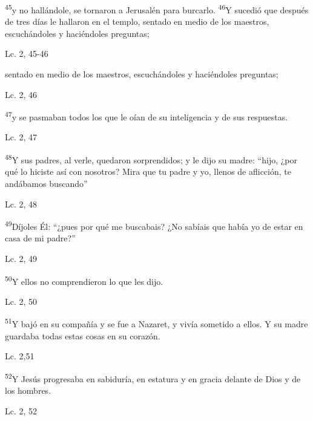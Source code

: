 \documentclass[a4paper,11pt]{article}
\begin{document}
      \textsuperscript{45}y no hallándole, se tornaron a Jerusalén para burcarlo. \textsuperscript{46}Y sucedió que después de tres días le hallaron en el templo,
      sentado en medio de los maestros, escuchándoles y haciéndoles preguntas;
      \begin{flushright}
        Lc. 2, 45-46       
      \end{flushright}
      
      sentado en medio de los maestros, escuchándoles y haciéndoles preguntas;
      \begin{flushright}
        Lc. 2, 46       
      \end{flushright}
      
      \textsuperscript{47}y se pasmaban todos los que le oían de su inteligencia y de sus respuestas.
      \begin{flushright}
        Lc. 2, 47     
      \end{flushright}

      \textsuperscript{48}Y sus padres, al verle, quedaron sorprendidos; y le dijo su madre: ``hijo, ¿por qué lo hiciste así con nosotros? Mira que tu padre
      y yo, llenos de aflicción, te andábamos buscando''
      \begin{flushright}
        Lc. 2, 48     
      \end{flushright}
      
      \textsuperscript{49}Díjoles Él: ``¿pues por qué me buscabais? ¿No sabíais que había yo de estar en casa de mi padre?''
      \begin{flushright}
        Lc. 2, 49        
      \end{flushright}
      
      \textsuperscript{50}Y ellos no comprendieron lo que les dijo.
      \begin{flushright}
        Lc. 2, 50        
      \end{flushright}
      
      \textsuperscript{51}Y bajó en su compañía y se fue a Nazaret, y vivía sometido a ellos. Y su madre guardaba todas estas
      cosas en su corazón.
      \begin{flushright}
        Lc. 2,51       
      \end{flushright}      
      
      \textsuperscript{52}Y Jesús progresaba en sabiduría, en estatura y en gracia delante de Dios y de los hombres.
      \begin{flushright}
        Lc. 2, 52        
      \end{flushright}
            
\end{document}
